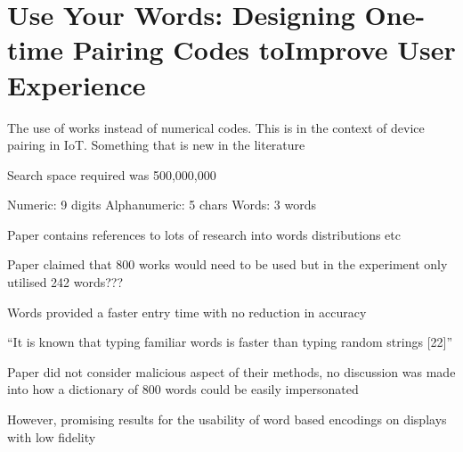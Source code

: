 \section{Use Your Words: Designing One-time Pairing Codes toImprove User Experience}

The use of works instead of numerical codes. This is in the context of device pairing in IoT. Something that is new in the literature

Search space required was 500,000,000

Numeric:        9 digits
Alphanumeric:   5 chars
Words:          3 words

Paper contains references to lots of research into words distributions etc

Paper claimed that 800 works would need to be used but in the experiment only utilised 242 words??? 

Words provided a faster entry time with no reduction in accuracy

``It is known that typing familiar words is faster than typing random strings [22]''

Paper did not consider malicious aspect of their methods, no discussion was made into how a dictionary of 800 words could be easily impersonated

However, promising results for the usability of word based encodings on displays with low fidelity